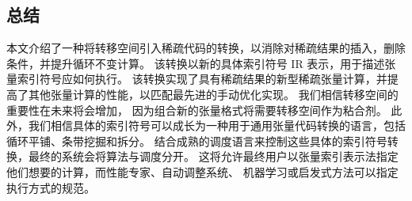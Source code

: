 \begin{translation}
\section{总结}
本文介绍了一种将转移空间引入稀疏代码的转换，以消除对稀疏结果的插入，删除条件，并提升循环不变计算。 该转换以新的具体索引符号 IR 表示，用于描述张量索引符号应如何执行。 
该转换实现了具有稀疏结果的新型稀疏张量计算，并提高了其他张量计算的性能，以匹配最先进的手动优化实现。 我们相信转移空间的重要性在未来将会增加，
因为组合新的张量格式将需要转移空间作为粘合剂。 此外，我们相信具体的索引符号可以成长为一种用于通用张量代码转换的语言，包括循环平铺、条带挖掘和拆分。 
结合成熟的调度语言来控制这些具体的索引符号转换，最终的系统会将算法与调度分开。 这将允许最终用户以张量索引表示法指定他们想要的计算，而性能专家、自动调整系统、
机器学习或启发式方法可以指定执行方式的规范。




\begin{translation-index}
  \nocite{kjolstad:2019:workspaces}
  
  
\end{translation-index}

\end{translation}
